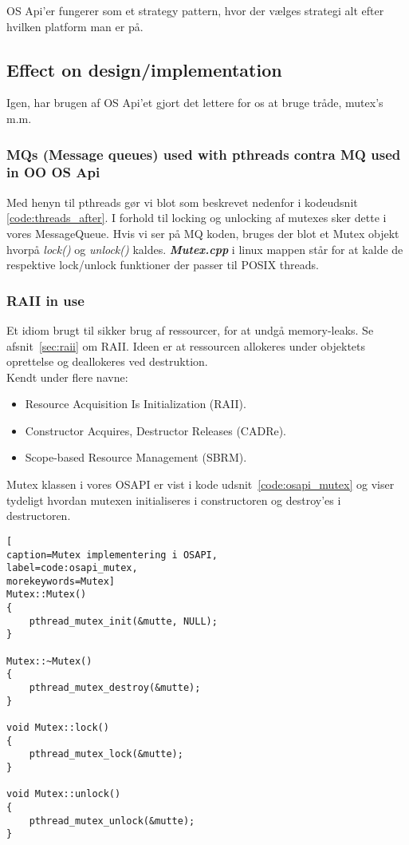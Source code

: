 OS Api'er fungerer som et strategy pattern, hvor der vælges strategi alt efter hvilken platform man er på.

\subsection{Effect on design/implementation}

Igen, har brugen af OS Api'et gjort det lettere for os at bruge tråde, mutex's m.m.

\subsubsection{MQs (Message queues) used with pthreads contra MQ used in OO OS Api}
Med henyn til pthreads gør vi blot som beskrevet nedenfor i kodeudsnit \ref{code:threads_after}. I forhold til locking og unlocking af mutexes sker dette i vores MessageQueue. Hvis vi ser på MQ koden, bruges der blot et Mutex objekt hvorpå \textit{lock()} og \textit{unlock()} kaldes. \textbf{\textit{Mutex.cpp}} i linux mappen står for at kalde de respektive lock/unlock funktioner der passer til POSIX threads.

\subsubsection{RAII in use}
Et idiom brugt til sikker brug af ressourcer, for at undgå memory-leaks. Se afsnit~\ref{sec:raii} om RAII. Ideen er at ressourcen allokeres under objektets oprettelse og deallokeres ved destruktion.\\

Kendt under flere navne: 
\begin{itemize}
	\item Resource Acquisition Is Initialization (RAII).
	\item Constructor Acquires, Destructor Releases (CADRe).
	\item Scope-based Resource Management (SBRM).
\end{itemize}

Mutex klassen i vores OSAPI er vist i kode udsnit~\ref{code:osapi_mutex} og viser tydeligt hvordan mutexen initialiseres i constructoren og destroy'es i destructoren.

\begin{lstlisting}[
caption=Mutex implementering i OSAPI,
label=code:osapi_mutex, 
morekeywords=Mutex]
Mutex::Mutex()
{ 
	pthread_mutex_init(&mutte, NULL);
}

Mutex::~Mutex()
{
	pthread_mutex_destroy(&mutte);
}

void Mutex::lock()
{
	pthread_mutex_lock(&mutte);
}

void Mutex::unlock()
{
	pthread_mutex_unlock(&mutte);
}
\end{lstlisting}

